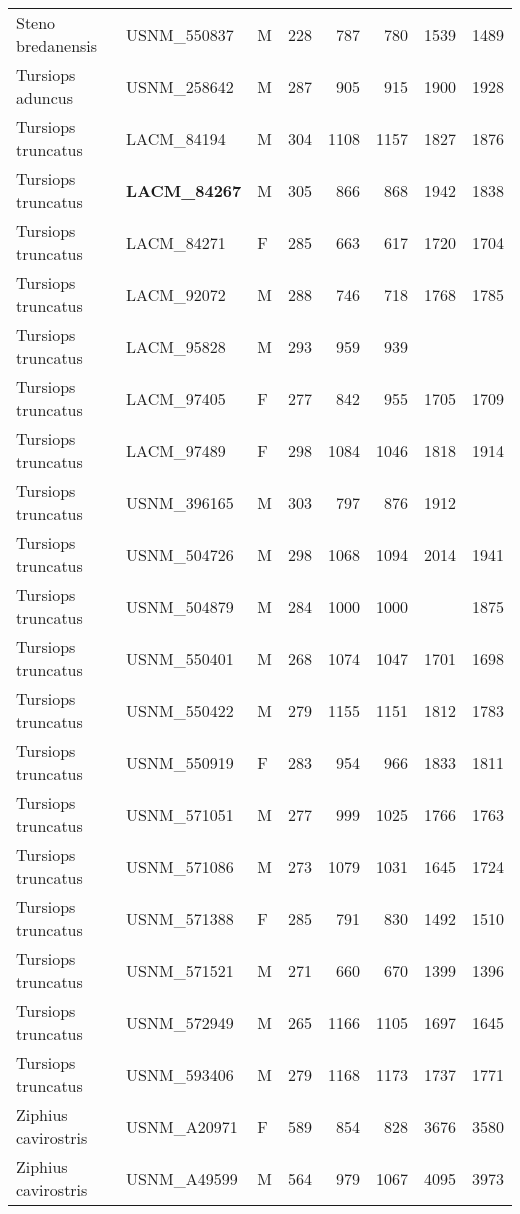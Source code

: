 \begin{table}[ht]
\begin{tabular}{lllrrrrr}
  Steno bredanensis & USNM\_550837 & M & 228 & 787 & 780 & 1539 & 1489 \\ 
  Tursiops aduncus & USNM\_258642 & M & 287 & 905 & 915 & 1900 & 1928 \\ 
  Tursiops truncatus & LACM\_84194 & M & 304 & 1108 & 1157 & 1827 & 1876 \\ 
  Tursiops truncatus & \textbf{ LACM\_84267 } & M & 305 & 866 & 868 & 1942 & 1838 \\ 
  Tursiops truncatus & LACM\_84271 & F & 285 & 663 & 617 & 1720 & 1704 \\ 
  Tursiops truncatus & LACM\_92072 & M & 288 & 746 & 718 & 1768 & 1785 \\ 
  Tursiops truncatus & LACM\_95828 & M & 293 & 959 & 939 &  &  \\ 
  Tursiops truncatus & LACM\_97405 & F & 277 & 842 & 955 & 1705 & 1709 \\ 
  Tursiops truncatus & LACM\_97489 & F & 298 & 1084 & 1046 & 1818 & 1914 \\ 
  Tursiops truncatus & USNM\_396165 & M & 303 & 797 & 876 & 1912 &  \\ 
  Tursiops truncatus & USNM\_504726 & M & 298 & 1068 & 1094 & 2014 & 1941 \\ 
  Tursiops truncatus & USNM\_504879 & M & 284 & 1000 & 1000 &  & 1875 \\ 
  Tursiops truncatus & USNM\_550401 & M & 268 & 1074 & 1047 & 1701 & 1698 \\ 
  Tursiops truncatus & USNM\_550422 & M & 279 & 1155 & 1151 & 1812 & 1783 \\ 
  Tursiops truncatus & USNM\_550919 & F & 283 & 954 & 966 & 1833 & 1811 \\ 
  Tursiops truncatus & USNM\_571051 & M & 277 & 999 & 1025 & 1766 & 1763 \\ 
  Tursiops truncatus & USNM\_571086 & M & 273 & 1079 & 1031 & 1645 & 1724 \\ 
  Tursiops truncatus & USNM\_571388 & F & 285 & 791 & 830 & 1492 & 1510 \\ 
  Tursiops truncatus & USNM\_571521 & M & 271 & 660 & 670 & 1399 & 1396 \\ 
  Tursiops truncatus & USNM\_572949 & M & 265 & 1166 & 1105 & 1697 & 1645 \\ 
  Tursiops truncatus & USNM\_593406 & M & 279 & 1168 & 1173 & 1737 & 1771 \\ 
  Ziphius cavirostris & USNM\_A20971 & F & 589 & 854 & 828 & 3676 & 3580 \\ 
  Ziphius cavirostris & USNM\_A49599 & M & 564 & 979 & 1067 & 4095 & 3973 \\ 
   \hline
\end{tabular}
\end{table}
